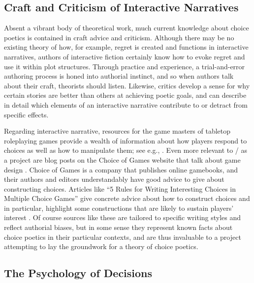 \subsection{Craft and Criticism of Interactive Narratives}

Absent a vibrant body of theoretical work, much current knowledge about choice poetics is contained in craft advice and criticism.
%
Although there may be no existing theory of how, for example, regret is created and functions in interactive narratives, authors of interactive fiction certainly know how to evoke regret and use it within plot structures.
%
Through practice and experience, a trial-and-error authoring process is honed into authorial instinct, and so when authors talk about their craft, theorists should listen.
%
Likewise, critics develop a sense for why certain stories are better than others at achieving poetic goals, and can describe in detail which elements of an interactive narrative contribute to or detract from specific effects.


Regarding interactive narrative, resources for the game masters of tabletop roleplaying games provide a wealth of information about how players respond to choices as well as how to manipulate them; see e.g., \citep{Laws2001}.
%
Even more relevant to \dunyazad/ as a project are blog posts on the Choice of Games website that talk about game design \citep{ChoiceOfGamesGameDesignCategory}.
%
Choice of Games is a company that publishes online gamebooks, and their authors and editors understandably have good advice to give about constructing choices.
%
Articles like ``5 Rules for Writing Interesting Choices in Multiple Choice Games'' give concrete advice about how to construct choices and in particular, highlight some constructions that are likely to sustain players' interest \citep{ChoiceOfGamesChoiceRules}.
%
Of course sources like these are tailored to specific writing styles and reflect authorial biases, but in some sense they represent known facts about choice poetics in their particular contexts, and are thus invaluable to a project attempting to lay the groundwork for a theory of choice poetics.


\subsection{The Psychology of Decisions}

